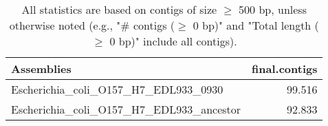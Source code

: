 \documentclass[12pt,a4paper]{article}
\begin{document}
\begin{table}[ht]
\begin{center}
\caption{All statistics are based on contigs of size $\geq$ 500 bp, unless otherwise noted (e.g., "\# contigs ($\geq$ 0 bp)" and "Total length ($\geq$ 0 bp)" include all contigs).}
\begin{tabular}{|l*{1}{|r}|}
\hline
Assemblies & final.contigs \\ \hline
Escherichia\_coli\_O157\_H7\_EDL933\_0930 & 99.516 \\ \hline
Escherichia\_coli\_O157\_H7\_EDL933\_ancestor & 92.833 \\ \hline
\end{tabular}
\end{center}
\end{table}
\end{document}
